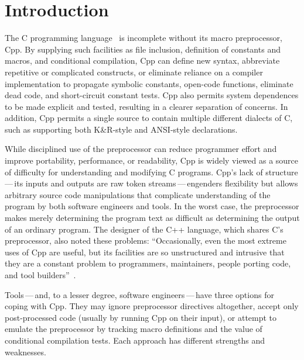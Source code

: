 \documentclass[10pt]{article}
\begin{document}
\bigskip

\section{Introduction}

The C programming language~\cite{KernighanR88,Harbison91} is incomplete
without its macro preprocessor, Cpp.  By supplying such facilities as file
inclusion, definition of constants and macros, and conditional compilation,
Cpp can define new syntax, abbreviate repetitive or complicated constructs,
or eliminate reliance on a compiler implementation to propagate symbolic
constants, open-code functions, eliminate dead code, and short-circuit
constant tests.  Cpp also permits system dependences to be made explicit
and tested, resulting in a clearer separation of concerns.  In addition,
Cpp permits a single source to contain multiple different dialects of C,
such as supporting both K\&R-style and ANSI-style declarations.


While disciplined use of the preprocessor can reduce programmer effort
and improve portability, performance, or readability, Cpp is widely
viewed as a source of difficulty for understanding and modifying C
programs.  Cpp's lack of structure\,---\,its inputs and
outputs are raw token streams\,---\,engenders flexibility but allows
arbitrary source code manipulations that complicate 
understanding of the program by both software engineers and tools.  In
the worst case, the preprocessor makes merely determining the program
text as difficult as determining the output of an ordinary program.
The designer of the C++ language, which shares C's preprocessor, also noted these
problems: ``Occasionally, even the most extreme uses of Cpp are
useful, but its facilities are so unstructured and intrusive that they
are a constant problem to programmers, maintainers, people porting
code, and tool builders''~\cite[p.~424]{Stroustrup-DesignEvolution}.

Tools\,---\,and, to a lesser degree, software engineers\,---\,have
three options for coping with Cpp.  They may ignore preprocessor
directives altogether, accept only post-processed code (usually by
running Cpp on their input), or attempt to emulate the preprocessor by
tracking macro definitions and the value of conditional compilation tests.
Each approach has different strengths and weaknesses.
\end{document}
